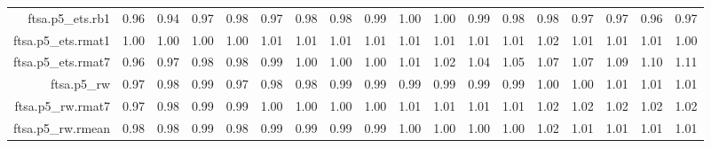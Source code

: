 \begin{tabular}{rrrrrrrrrrrrrrrrrr}
  ftsa.p5\_ets.rb1 & 0.96 & 0.94 & 0.97 & 0.98 & 0.97 & 0.98 & 0.98 & 0.99 & 1.00 & 1.00 & 0.99 & 0.98 & 0.98 & 0.97 & 0.97 & 0.96 & 0.97 \\ 
  ftsa.p5\_ets.rmat1 & 1.00 & 1.00 & 1.00 & 1.00 & 1.01 & 1.01 & 1.01 & 1.01 & 1.01 & 1.01 & 1.01 & 1.01 & 1.02 & 1.01 & 1.01 & 1.01 & 1.00 \\ 
  ftsa.p5\_ets.rmat7 & 0.96 & 0.97 & 0.98 & 0.98 & 0.99 & 1.00 & 1.00 & 1.00 & 1.01 & 1.02 & 1.04 & 1.05 & 1.07 & 1.07 & 1.09 & 1.10 & 1.11 \\ 
  ftsa.p5\_rw & 0.97 & 0.98 & 0.99 & 0.97 & 0.98 & 0.98 & 0.99 & 0.99 & 0.99 & 0.99 & 0.99 & 0.99 & 1.00 & 1.00 & 1.01 & 1.01 & 1.01 \\ 
  ftsa.p5\_rw.rmat7 & 0.97 & 0.98 & 0.99 & 0.99 & 1.00 & 1.00 & 1.00 & 1.00 & 1.01 & 1.01 & 1.01 & 1.01 & 1.02 & 1.02 & 1.02 & 1.02 & 1.02 \\ 
  ftsa.p5\_rw.rmean & 0.98 & 0.98 & 0.99 & 0.98 & 0.99 & 0.99 & 0.99 & 0.99 & 1.00 & 1.00 & 1.00 & 1.00 & 1.02 & 1.01 & 1.01 & 1.01 & 1.01 \\ 
   \hline
\end{tabular}
